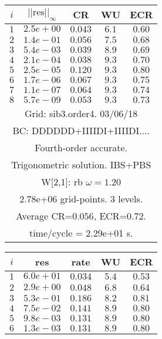 \documentclass[12pt]{article}
\begin{document}
\begin{table}[hbt]
\begin{center}
{\tablefontsize
\begin{tabular}{|c|c|c|c|c|} \hline 
 $i$   & $\vert\vert\mbox{res}\vert\vert_\infty$  &  CR     &  WU    & ECR  \\   \hline 
 $ 1$  & $ 2.5e+00$ & $0.043$ & $ 6.1$ & $0.60$ \\ 
 $ 2$  & $ 1.4e-01$ & $0.056$ & $ 7.5$ & $0.68$ \\ 
 $ 3$  & $ 5.4e-03$ & $0.039$ & $ 8.9$ & $0.69$ \\ 
 $ 4$  & $ 2.1e-04$ & $0.038$ & $ 9.3$ & $0.70$ \\ 
 $ 5$  & $ 2.5e-05$ & $0.120$ & $ 9.3$ & $0.80$ \\ 
 $ 6$  & $ 1.7e-06$ & $0.067$ & $ 9.3$ & $0.75$ \\ 
 $ 7$  & $ 1.1e-07$ & $0.064$ & $ 9.3$ & $0.74$ \\ 
 $ 8$  & $ 5.7e-09$ & $0.053$ & $ 9.3$ & $0.73$ \\ 
\hline 
\multicolumn{5}{|c|}{Grid: sib3.order4. 03/06/18}  \\
\multicolumn{5}{|c|}{BC: DDDDDD+IIIIDI+IIIIDI....}  \\
\multicolumn{5}{|c|}{Fourth-order accurate.}  \\
\multicolumn{5}{|c|}{Trigonometric solution. IBS+PBS}  \\
\multicolumn{5}{|c|}{W[2,1]: rb $\omega=1.20$}  \\
\multicolumn{5}{|c|}{2.78e+06 grid-points. 3 levels.}  \\
\multicolumn{5}{|c|}{Average CR=$0.056$, ECR=$0.72$.}  \\
\multicolumn{5}{|c|}{time/cycle = 2.29e+01 s.}  \\
\hline 
\end{tabular}
\begin{tabular}{|c|c|c|c|c|} \hline 
 $i$   & res      & rate    &  WU    & ECR  \\   \hline 
 $ 1$  & $ 6.0e+01$ & $0.034$ & $ 5.4$ & $0.53$ \\ 
 $ 2$  & $ 2.9e+00$ & $0.048$ & $ 6.8$ & $0.64$ \\ 
 $ 3$  & $ 5.3e-01$ & $0.186$ & $ 8.2$ & $0.81$ \\ 
 $ 4$  & $ 7.5e-02$ & $0.141$ & $ 8.9$ & $0.80$ \\ 
 $ 5$  & $ 9.8e-03$ & $0.131$ & $ 8.9$ & $0.80$ \\ 
 $ 6$  & $ 1.3e-03$ & $0.131$ & $ 8.9$ & $0.80$ \\ 

\end{tabular}}
\end{center}
\end{table}
\end{document}
